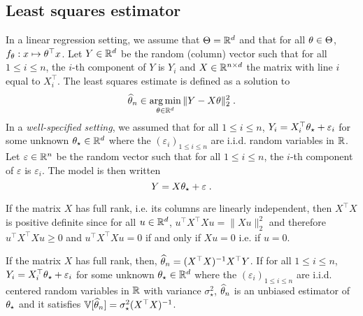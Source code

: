 \subsection{Least squares estimator}
In a linear regression setting, we assume that $\Theta = \mathbb{R}^d$ and that  for all $\theta\in\Theta$, $f_\theta: x \mapsto \theta^\top x$.  Let $Y\in\mathbb{R}^d$  be the random (column) vector such that  for all $1\leqslant i \leqslant n$, the $i$-th component of $Y$ is $Y_i$  and $X\in\mathbb{R}^{n\times d}$ the matrix with line $i$ equal to $X^\top_i$. 
The least squares estimate is defined as a solution to
\[
\widehat \param_n\in  \argmin_{\param\in\rset^d}  \|Y - X\param\|_2^2\eqsp.
\]
In a {\em well-specified setting}, we assumed that  for all $1\leqslant i \leqslant n$, $Y_i = X^\top_i \theta_{\star} + \varepsilon_i$ for some unknown $\theta_\star\in\mathbb{R}^d$ where the $(\varepsilon_i)_{1\leqslant i\leqslant n}$ are i.i.d. random variables in $\mathbb{R}$. Let  $\varepsilon\in\mathbb{R}^n$  be the random vector such that  for all $1\leqslant i \leqslant n$, the $i$-th component of $\varepsilon$  is $\varepsilon_i$. The model is then written
\[
Y = X \theta_{\star} + \varepsilon\;.
\]

\begin{remark}
If the matrix $X$ has full rank, i.e. its columns are linearly independent, then $X^\top X$ is positive definite since for all $u\in\mathbb{R}^d$, $u^\top X^\top X u = \|Xu\|_2^2$ and therefore  $u^\top X^\top X u \geqslant 0$ and $u^\top X^\top X u = 0$ if and only if $Xu = 0$ i.e. if $u=0$.
\end{remark}

\begin{shaded}
\begin{proposition}
\label{prop:least:squares:full:rank}
If the matrix $X$ has full rank, then, $\widehat {\theta}_n = (X^\top X)^{-1}X^\top Y$. If for all $1\leqslant i \leqslant n$, $Y_i = X^\top_i \theta_{\star} + \varepsilon_i$ for some unknown $\theta_\star\in\mathbb{R}^d$ where the $(\varepsilon_i)_{1\leqslant i\leqslant n}$ are i.i.d. centered random variables in $\mathbb{R}$ with variance $\sigma_\star^2$, $\widehat {\theta}_n$  is an unbiased estimator of $\theta_\star$ and it satisfies $\mathbb{V}[\widehat {\theta}_n] = \sigma_\star^2 (X^\top X)^{-1}$.
\end{proposition}
\end{shaded}

